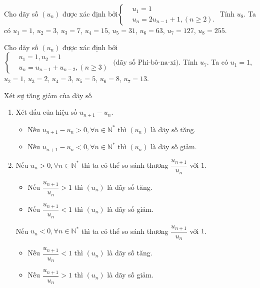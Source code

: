 \begin{vd}
	Cho dãy số $(u_n)$ được xác định bởi$\left\{\begin{aligned}&u_1=1 \\&u_n=2u_{n-1}+1, (n\geq 2).\end{aligned}\right.$ Tính $u_8$.
	\loigiai
	{
		Ta có $u_1=1$, $u_2=3$, $u_3=7$, $u_4=15$, $u_5=31$, $u_6=63$, $u_7=127$, $u_8=255$.
	}
\end{vd}

\begin{vd}
	Cho dãy số $(u_n)$ được xác định bởi
	$\left\{\begin{aligned}&u_1=1, u_2=1 \\&u_n=u_{n-1}+u_{n-2}, (n\geq 3)\end{aligned}\right. \text{ (dãy số Phi-bô-na-xi)}.$ Tính $u_7$.
	\loigiai
	{
	Ta có $u_1=1$, $u_2=1$, $u_3=2$, $u_4=3$, $u_5=5$, $u_6=8$, $u_7=13$.
	}
\end{vd}


\begin{dang}{Xét sự tăng giảm của dãy số}
	
	\begin{enumerate}[\iconMT]
		\item {} Xét dấu của hiệu số $u_{n+1}-u_n$.
		\begin{itemize}
			\item Nếu $u_{n+1}-u_n>0, \forall n \in \mathbb{N}^*$ thì $(u_n)$ là dãy số tăng.
			\item Nếu $u_{n+1}-u_n<0, \forall n \in \mathbb{N}^*$ thì $(u_n)$ là dãy số giảm.
		\end{itemize}
		\item {} Nếu $u_n>0, \forall n\in \mathbb{N}^*$ thì ta có thể so sánh thương $\dfrac{u_{n+1}}{u_n}$ với $1$.
		\begin{itemize}
			\item Nếu $\dfrac{u_{n+1}}{u_n}>1$ thì $(u_n)$ là dãy số tăng.
			\item Nếu $\dfrac{u_{n+1}}{u_n}<1$ thì $(u_n)$ là dãy số giảm.
		\end{itemize}
		Nếu $u_n<0, \forall n\in \mathbb{N}^*$ thì ta có thể so sánh thương $\dfrac{u_{n+1}}{u_n}$ với $1$.
		\begin{itemize}
			\item Nếu $\dfrac{u_{n+1}}{u_n}<1$ thì $(u_n)$ là dãy số tăng.
			\item Nếu $\dfrac{u_{n+1}}{u_n}>1$ thì $(u_n)$ là dãy số giảm.
		\end{itemize}
	\end{enumerate}
\end{dang}

